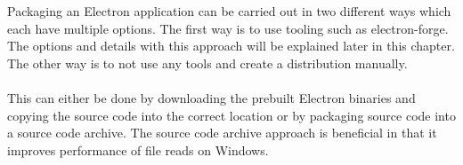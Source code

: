  
Packaging an Electron application can be carried out in two different ways which each have multiple options.
The first way is to use tooling such as electron-forge. 
The options and details with this approach will be explained later in this chapter.
The other way is to not use any tools and create a distribution manually.\paragraph{}
This can either be done by downloading the prebuilt Electron binaries and copying the 
source code into the correct location or by packaging source code into a source code archive.
The source code archive approach is beneficial in that it improves performance of file reads
on Windows. \parencite{electronDocsDist}\paragraph{}

